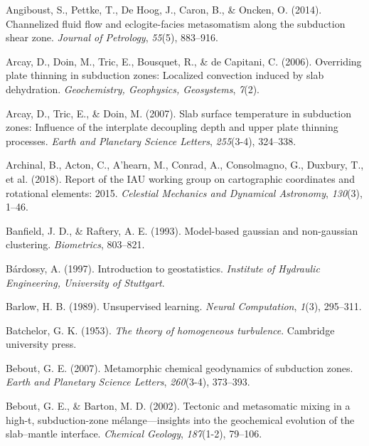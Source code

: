 \begin{CSLReferences}{1}{1}
\leavevmode{}%
Angiboust, S., Pettke, T., De Hoog, J., Caron, B., \& Oncken, O. (2014). Channelized fluid flow and eclogite-facies metasomatism along the subduction shear zone. \emph{Journal of Petrology}, \emph{55}(5), 883--916.

\leavevmode{}%
Arcay, D., Doin, M., Tric, E., Bousquet, R., \& de Capitani, C. (2006). Overriding plate thinning in subduction zones: Localized convection induced by slab dehydration. \emph{Geochemistry, Geophysics, Geosystems}, \emph{7}(2).

\leavevmode{}%
Arcay, D., Tric, E., \& Doin, M. (2007). Slab surface temperature in subduction zones: Influence of the interplate decoupling depth and upper plate thinning processes. \emph{Earth and Planetary Science Letters}, \emph{255}(3-4), 324--338.

\leavevmode{}%
Archinal, B., Acton, C., A'hearn, M., Conrad, A., Consolmagno, G., Duxbury, T., et al. (2018). Report of the IAU working group on cartographic coordinates and rotational elements: 2015. \emph{Celestial Mechanics and Dynamical Astronomy}, \emph{130}(3), 1--46.

\leavevmode{}%
Banfield, J. D., \& Raftery, A. E. (1993). Model-based gaussian and non-gaussian clustering. \emph{Biometrics}, 803--821.

\leavevmode{}%
Bárdossy, A. (1997). Introduction to geostatistics. \emph{Institute of Hydraulic Engineering, University of Stuttgart}.

\leavevmode{}%
Barlow, H. B. (1989). Unsupervised learning. \emph{Neural Computation}, \emph{1}(3), 295--311.

\leavevmode{}%
Batchelor, G. K. (1953). \emph{The theory of homogeneous turbulence}. Cambridge university press.

\leavevmode{}%
Bebout, G. E. (2007). Metamorphic chemical geodynamics of subduction zones. \emph{Earth and Planetary Science Letters}, \emph{260}(3-4), 373--393.

\leavevmode{}%
Bebout, G. E., \& Barton, M. D. (2002). Tectonic and metasomatic mixing in a high-t, subduction-zone m{é}lange---insights into the geochemical evolution of the slab--mantle interface. \emph{Chemical Geology}, \emph{187}(1-2), 79--106.


\end{CSLReferences}
